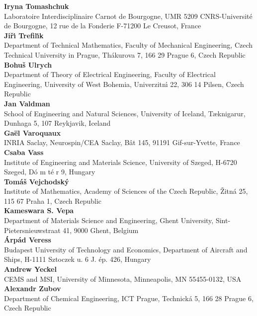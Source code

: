 \noindent
{\bf Iryna Tomashchuk}\\
Laboratoire Interdisciplinaire Carnot de Bourgogne,
UMR 5209 CNRS-Universit\'{e} de Bourgogne,
12 rue de la Fonderie F-71200 Le Creusot,
France\\

\noindent
{\bf Ji\v r\'{\i} Trefil\'{\i}k}\\
Department of Technical Mathematics,
Faculty of Mechanical Engineering,
Czech Technical University in Prague,
Th\'akurova 7,
166 29 Prague 6,
Czech Republic\\

\noindent
{\bf Bohu\v{s} Ulrych}\\
Department of Theory of Electrical Engineering,
Faculty of Electrical Engineering,
University of West Bohemia,
Univerzitn\'{\i} 22,
306 14 Pilsen,
Czech Republic\\

\noindent
{\bf Jan Valdman}\\
School of Engineering and Natural Sciences,
University of Iceland,
T{\ae}knigar{\dh}ur,
Dunhaga 5,
107 Reykjavik,
Iceland\\

\noindent
{\bf Ga\" el Varoquaux}\\
INRIA Saclay,
Neurospin/CEA Saclay, B\^at 145,
91191 Gif-sur-Yvette,
France\\

\noindent
{\bf Csaba Vass}\\
Institute of Engineering and Materials Science,
University of Szeged,
H-6720 Szeged,
D\'o m t\'e r 9,
Hungary\\

\noindent
{\bf Tom\'a\v s Vejchodsk\'y}\\
Institute of Mathematics,
Academy of Sciences of the Czech Republic,
\v Zitn\'a 25,
115 67 Praha 1,
Czech Republic\\

\noindent
{\bf Kameswara S. Vepa}\\
Department of Materials Science and Engineering,
Ghent University,
Sint-Pietersnieuwstraat 41,
9000 Ghent,
Belgium\\

\noindent
{\bf \'Arp\'ad Veress}\\
Budapest University of Technology and Economics,
Department of Aircraft and Ships,
H-1111 Sztoczek u. 6 J. ép. 426,
Hungary\\

\noindent
{\bf Andrew Yeckel}\\
CEMS and MSI,
University of Minnesota,
Minneapolis,
MN 55455-0132,
USA\\

\noindent
{\bf Alexandr Zubov}\\
Department of Chemical Engineering,
ICT Prague,
Technick\'a 5,
166 28 Prague 6,
Czech Republic\\
